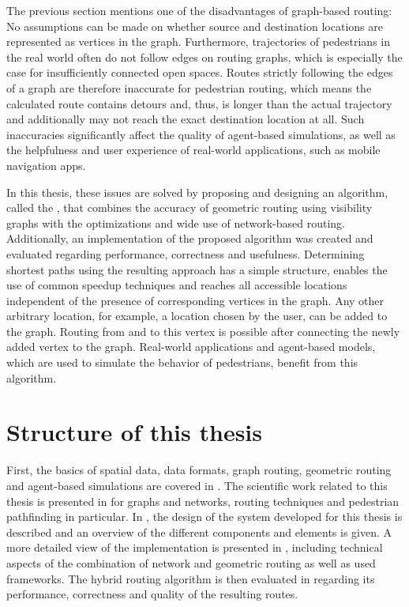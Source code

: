 	The previous section mentions one of the disadvantages of graph-based routing:
	No assumptions can be made on whether source and destination locations are represented as vertices in the graph.
	Furthermore, trajectories of pedestrians in the real world often do not follow edges on routing graphs, which is especially the case for insufficiently connected open spaces.
	Routes strictly following the edges of a graph are therefore inaccurate for pedestrian routing\cite{graser-osm-open-spaces}, which means the calculated route contains detours and, thus, is longer than the actual trajectory and additionally may not reach the exact destination location at all.
	Such inaccuracies significantly affect the quality of agent-based simulations, as well as the helpfulness and user experience of real-world applications, such as mobile navigation apps.
	
	In this thesis, these issues are solved by proposing and designing an algorithm, called the , that combines the accuracy of geometric routing using visibility graphs with the optimizations and wide use of network-based routing.
	Additionally, an implementation of the proposed algorithm was created and evaluated regarding performance, correctness and usefulness.
	Determining shortest paths using the resulting approach has a simple structure, enables the use of common speedup techniques and reaches all accessible locations independent of the presence of corresponding vertices in the graph.
	Any other arbitrary location, for example, a location chosen by the user, can be added to the graph.
	Routing from and to this vertex is possible after connecting the newly added vertex to the graph.
	Real-world applications and agent-based models, which are used to simulate the behavior of pedestrians, benefit from this algorithm.

\section{Structure of this thesis}
	
	First, the basics of spatial data, data formats, graph routing, geometric routing and agent-based simulations are covered in .
	The scientific work related to this thesis is presented in  for graphs and networks, routing techniques and pedestrian pathfinding in particular.
	In , the design of the system developed for this thesis is described and an overview of the different components and elements is given.
	A more detailed view of the implementation is presented in , including technical aspects of the combination of network and geometric routing as well as used frameworks.
	The hybrid routing algorithm is then evaluated in  regarding its performance, correctness and quality of the resulting routes.